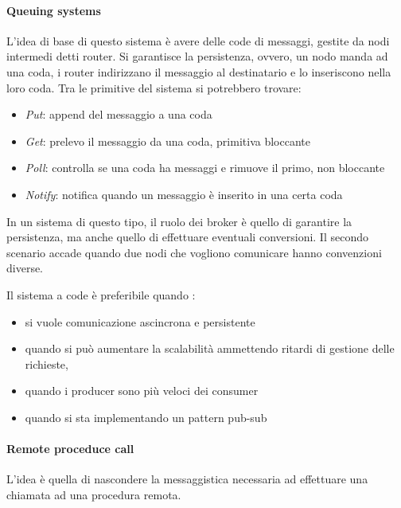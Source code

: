 \paragraph{Queuing systems}
L'idea di base di questo sistema è avere delle code di messaggi, gestite 
da nodi intermedi detti router. 
Si garantisce la persistenza, ovvero, un nodo manda ad una coda, i router 
indirizzano il messaggio al destinatario e lo inseriscono nella loro coda.
Tra le primitive del sistema si potrebbero trovare:
\begin{itemize}
    \item \emph{Put}: append del messaggio a una coda
    \item \emph{Get}: prelevo il messaggio da una coda, primitiva bloccante
    \item \emph{Poll}: controlla se una coda ha messaggi e rimuove il primo, non bloccante
    \item \emph{Notify}: notifica quando un messaggio è inserito in una certa coda
\end{itemize}
In un sistema di questo tipo, il ruolo dei broker è quello di garantire la persistenza, 
ma anche quello di effettuare eventuali conversioni. Il secondo scenario accade quando 
due nodi che vogliono comunicare hanno convenzioni diverse. 

Il sistema a code è preferibile quando :
\begin{itemize}
    \item si vuole comunicazione ascincrona e persistente 
    \item quando si può aumentare la scalabilità ammettendo ritardi di gestione delle richieste, 
    \item quando i producer sono più veloci dei consumer
    \item quando si sta implementando un pattern pub-sub
\end{itemize}

\paragraph{Remote proceduce call}
L'idea è quella di nascondere la messaggistica necessaria ad effettuare una 
chiamata ad una procedura remota.

